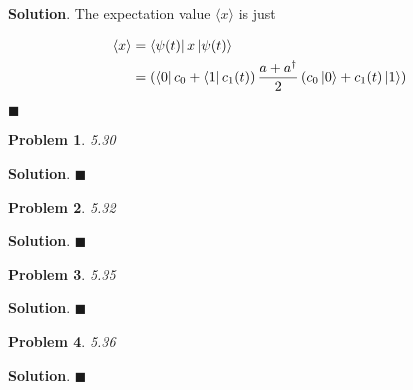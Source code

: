 \documentclass[12pt]{article}
\newtheorem{p}{Problem}
\theoremstyle{definition}
\newenvironment{s}{%
        \begin{trivlist} \item \textbf{Solution}. }{%
            \hspace*{\fill} $\blacksquare$\end{trivlist}}%
\begin{document}
{\begin{s}
The expectation value $\langle x \rangle$ is just

\begin{align*}
\langle x \rangle &= \bra{\psi(t)} x \ket{\psi(t)} \\
&= \left(\bra{0}c_{0} + \bra{1}c_{1}(t)\right)\frac{a+a^{\dagger}}{2}\left(c_{0}\ket{0} + c_{1}(t)\ket{1}\right)
\end{align*}

\end{s}

\begin{p}
5.30
\end{p}

\begin{s}
\end{s}

\begin{p}
5.32
\end{p}

\begin{s}
\end{s}

\begin{p}
5.35
\end{p}

\begin{s}
\end{s}

\begin{p}
5.36
\end{p}

\begin{s}
\end{s}
\end{document}
